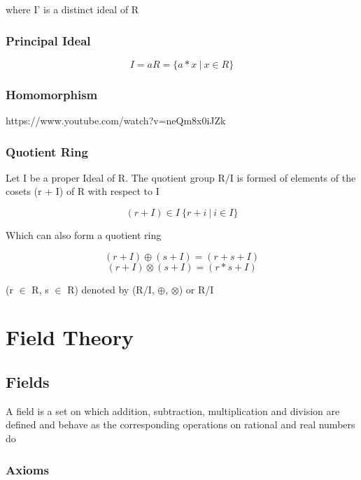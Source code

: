 \documentclass[10pt,a4paper]{report}
\begin{document}
where I' is a distinct ideal of R

\subsection*{Principal Ideal}

\begin{equation}
	I = aR = \{ a * x\ |\ x \in R \}
\end{equation}



\subsection{Homomorphism}

https://www.youtube.com/watch?v=neQm8x0iJZk
\subsection{Quotient Ring}
Let I be a proper Ideal of R. The quotient group R/I is formed of elements of the cosets (r + I) of R with respect to I

\begin{equation}
	(r + I) \in I\ \{ r + i\ |\ i \in I \}
\end{equation}

Which can also form a quotient ring

\begin{equation}
	( r + I ) \oplus ( s + I ) = ( r + s + I)
\end{equation}
\begin{equation}
	( r + I ) \otimes ( s + I ) = ( r * s + I)
\end{equation}

(r $\in$ R, s $\in$ R) denoted by (R/I, $\oplus$, $\otimes$) or R/I 


\chapter{Field Theory}
\section{Fields}
A field is a set on which addition, subtraction, multiplication and division are defined and behave as the corresponding operations on rational and real numbers do

\subsection{Axioms}
\end{document}
